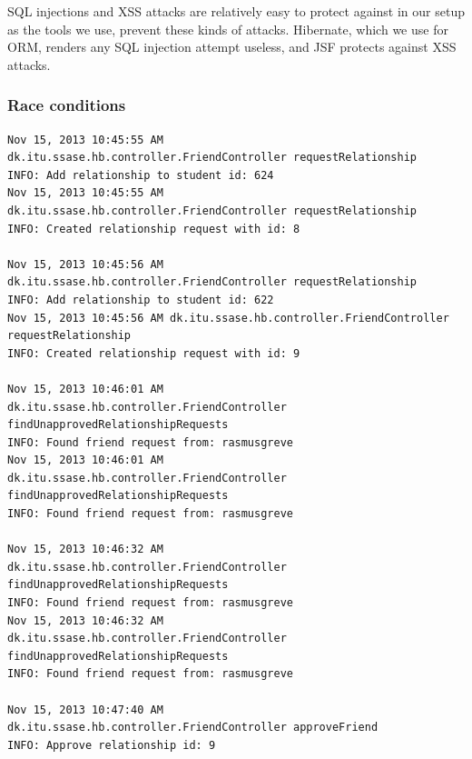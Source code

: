 \documentclass[a4paper]{article}
\begin{document}
SQL injections and XSS attacks are relatively easy to protect against in our setup as the tools we use, prevent these kinds of attacks. Hibernate, which we use for ORM, renders any SQL injection attempt useless, and JSF protects against XSS attacks.

\subsubsection{Race conditions}
\begin{verbatim}
Nov 15, 2013 10:45:55 AM 
dk.itu.ssase.hb.controller.FriendController requestRelationship
INFO: Add relationship to student id: 624
Nov 15, 2013 10:45:55 AM 
dk.itu.ssase.hb.controller.FriendController requestRelationship
INFO: Created relationship request with id: 8

Nov 15, 2013 10:45:56 AM 
dk.itu.ssase.hb.controller.FriendController requestRelationship
INFO: Add relationship to student id: 622
Nov 15, 2013 10:45:56 AM dk.itu.ssase.hb.controller.FriendController requestRelationship
INFO: Created relationship request with id: 9

Nov 15, 2013 10:46:01 AM 
dk.itu.ssase.hb.controller.FriendController findUnapprovedRelationshipRequests
INFO: Found friend request from: rasmusgreve
Nov 15, 2013 10:46:01 AM 
dk.itu.ssase.hb.controller.FriendController findUnapprovedRelationshipRequests
INFO: Found friend request from: rasmusgreve

Nov 15, 2013 10:46:32 AM 
dk.itu.ssase.hb.controller.FriendController findUnapprovedRelationshipRequests
INFO: Found friend request from: rasmusgreve
Nov 15, 2013 10:46:32 AM 
dk.itu.ssase.hb.controller.FriendController findUnapprovedRelationshipRequests
INFO: Found friend request from: rasmusgreve

Nov 15, 2013 10:47:40 AM 
dk.itu.ssase.hb.controller.FriendController approveFriend
INFO: Approve relationship id: 9
\end{verbatim}
\end{document}
